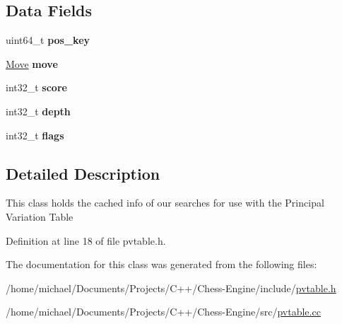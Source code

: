 \subsection*{Data Fields}
\begin{DoxyCompactItemize}
\item 
\mbox{\label{classPvEntry_ab1e717bdabc6da4bf546d0b1af252091}} 
uint64\+\_\+t {\bfseries pos\+\_\+key}
\item 
\mbox{\label{classPvEntry_a6e6ab2e38db069902f7aeb2dae727a1e}} 
\mbox{\hyperlink{classMove}{Move}} {\bfseries move}
\item 
\mbox{\label{classPvEntry_a00a4547715d4b994bf2e889e7a4b29a9}} 
int32\+\_\+t {\bfseries score}
\item 
\mbox{\label{classPvEntry_a75056e46bf9a3a8ed3955119fc83ace8}} 
int32\+\_\+t {\bfseries depth}
\item 
\mbox{\label{classPvEntry_a90d1ef7b561954f7265af72e3cdd94be}} 
int32\+\_\+t {\bfseries flags}
\end{DoxyCompactItemize}


\subsection{Detailed Description}
This class holds the cached info of our searches for use with the Principal Variation Table 

Definition at line 18 of file pvtable.\+h.



The documentation for this class was generated from the following files\+:\begin{DoxyCompactItemize}
\item 
/home/michael/\+Documents/\+Projects/\+C++/\+Chess-\/\+Engine/include/\mbox{\hyperlink{pvtable_8h}{pvtable.\+h}}\item 
/home/michael/\+Documents/\+Projects/\+C++/\+Chess-\/\+Engine/src/\mbox{\hyperlink{pvtable_8cc}{pvtable.\+cc}}\end{DoxyCompactItemize}
